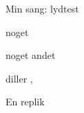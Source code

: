 \begin{Sang}[noget]{Min sang: lydtest}  %

	\begin{Lydeffekter}
		\item noget
		\item noget andet
	\end{Lydeffekter}



	\begin{Regi}
		diller  , \fuldscene{}
	\end{Regi}

	\begin{Replik}[B]
		 En replik
	\end{Replik}

\end{Sang}


